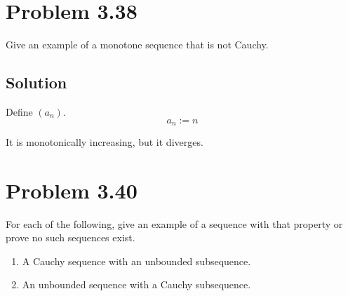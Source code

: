 \documentclass[12pt]{report}
\begin{document}
\section{Problem 3.38}
    Give an example of a monotone sequence that is not Cauchy.

    \subsection{Solution}
        Define $(a_n)$.
        \begin{equation}
            a_n := n
        \end{equation}

        It is monotonically increasing, but it diverges.
\pagebreak

\section{Problem 3.40}
    For each of the following, give an example of a sequence with that property or prove no such sequences exist.
    \begin{enumerate}[label=(\alph*)]
        \item   A Cauchy sequence with an unbounded subsequence.
        \item   An unbounded sequence with a Cauchy subsequence.
    \end{enumerate}
\end{document}
